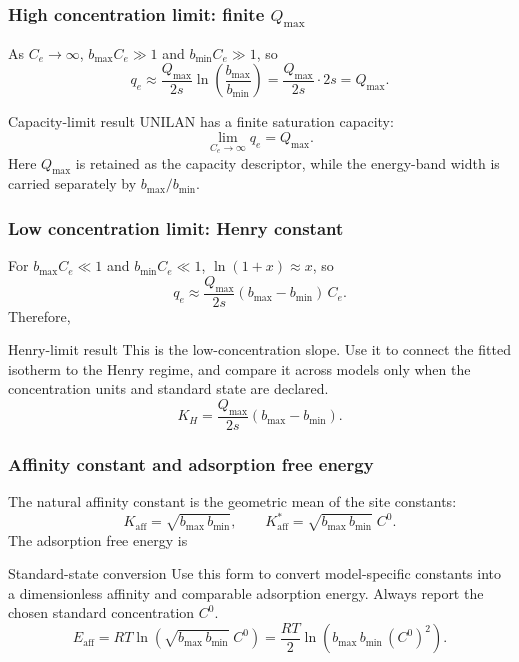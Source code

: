 \documentclass[journal=jacsat,manuscript=article]{achemso}
\begin{document}
\subsubsection{High concentration limit: finite $Q_{\max}$}

As $C_e \to \infty$, $b_{\max}C_e \gg 1$ and $b_{\min}C_e \gg 1$, so
\begin{equation}
	q_e \approx \frac{Q_{\max}}{2s}
	\ln\!\left(\frac{b_{\max}}{b_{\min}}\right)
	= \frac{Q_{\max}}{2s} \cdot 2s = Q_{\max}.
\end{equation}
\begin{greenbox}{Capacity-limit result}
	UNILAN has a finite saturation capacity:
	\begin{equation}
		\lim_{C_e \to \infty} q_e = Q_{\max}.
	\end{equation}
	Here \(Q_{\max}\) is retained as the capacity descriptor, while the
	energy-band width is carried separately by \(b_{\max}/b_{\min}\).
\end{greenbox}

\subsubsection{Low concentration limit: Henry constant}

For $b_{\max}C_e \ll 1$ and $b_{\min}C_e \ll 1$,
$\ln(1+x) \approx x$, so
\begin{equation}
	q_e \approx \frac{Q_{\max}}{2s}(b_{\max} - b_{\min})\, C_e.
\end{equation}
Therefore,
\begin{greenbox}{Henry-limit result}
	This is the low-concentration slope. Use it to connect the fitted isotherm to the Henry regime, and compare it across models only when the concentration units and standard state are declared.
\begin{equation}
	K_H = \frac{Q_{\max}}{2s}(b_{\max} - b_{\min}).
\end{equation}
\end{greenbox}

\subsubsection{Affinity constant and adsorption free energy}

The natural affinity constant is the geometric mean of the site constants:
\begin{equation}
	K_{\mathrm{aff}} = \sqrt{b_{\max}\, b_{\min}},
	\qquad
	K_{\mathrm{aff}}^{\ast} = \sqrt{b_{\max}\, b_{\min}}\; C^0.
\end{equation}
The adsorption free energy is
\begin{greenbox}{Standard-state conversion}
	Use this form to convert model-specific constants into a dimensionless affinity and comparable adsorption energy. Always report the chosen standard concentration \(C^0\).
\begin{equation}
	E_{\mathrm{aff}} = RT\ln\!\left(\sqrt{b_{\max}\, b_{\min}}\; C^0\right)
		= \frac{RT}{2}\ln\!\left(b_{\max}\, b_{\min}\, (C^0)^2\right).
\end{equation}
\end{greenbox}
\end{document}

